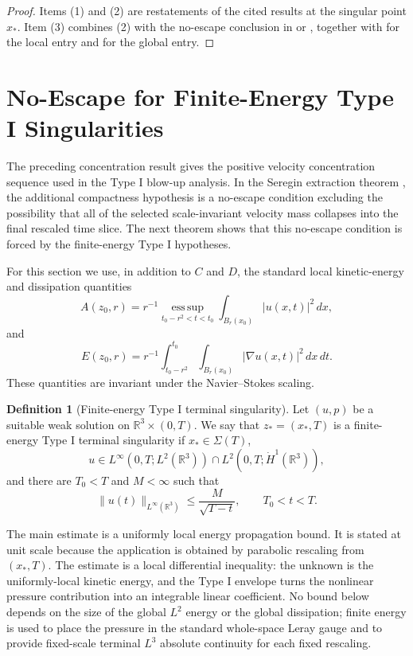 \documentclass[11pt]{amsart}
\theoremstyle{plain}
\theoremstyle{definition}
\newtheorem{definition}[definition]{Definition}
\theoremstyle{remark}
\numberwithin{equation}{section}
\begin{document}
\begin{proof}
Items (1) and (2) are restatements of the cited results at the singular
point \(x_*\).  Item (3) combines (2) with the no-escape conclusion in
 or
, together with
 for the local entry and
 for the global entry.
\end{proof}

\section{No-Escape for Finite-Energy Type I Singularities}
\label{p0:sec:auto-no-escape}

The preceding concentration result gives the positive velocity concentration
sequence used in the Type I blow-up analysis.  In the Seregin extraction
theorem , the
additional compactness hypothesis is a no-escape condition excluding the possibility
that all of the selected scale-invariant velocity mass collapses into the
final rescaled time slice.  The next theorem shows that this no-escape condition is
forced by the finite-energy Type I hypotheses.

For this section we use, in addition to \(C\) and \(D\), the standard local
kinetic-energy and dissipation quantities
\[
  A(z_0,r)
  =r^{-1}\operatorname*{ess\,sup}_{t_0-r^2<t<t_0}
    \int_{B_r(x_0)} |u(x,t)|^2\,dx,
\]
and
\[
  E(z_0,r)
  =r^{-1}\int_{t_0-r^2}^{t_0}\int_{B_r(x_0)}
    |\nabla u(x,t)|^2\,dx\,dt .
\]
These quantities are invariant under the Navier--Stokes scaling.

\begin{definition}[Finite-energy Type I terminal singularity]
\label{p0:def:finite-energy-typeI-paper0}
Let \((u,p)\) be a suitable weak solution on \(\mathbb R^3\times(0,T)\).
We say that \(z_*=(x_*,T)\) is a finite-energy Type I terminal singularity if
\(x_*\in\Sigma(T)\),
\[
  u\in L^\infty(0,T;L^2(\mathbb R^3))
  \cap L^2(0,T;\dot H^1(\mathbb R^3)),
\]
and there are \(T_0<T\) and \(M<\infty\) such that
\begin{equation}\label{p0:eq:paper0-global-typeI}
  \|u(t)\|_{L^\infty(\mathbb R^3)}
  \le \frac{M}{\sqrt{T-t}},
  \qquad T_0<t<T .
\end{equation}
\end{definition}

The main estimate is a uniformly local energy propagation bound.  It is stated
at unit scale because the application is obtained by parabolic rescaling from
\((x_*,T)\).  The estimate is a local differential inequality: the unknown is the
uniformly-local kinetic energy, and the Type I envelope turns the nonlinear
pressure contribution into an integrable linear coefficient.  No bound below
depends on the size of the global \(L^2\) energy or the global dissipation;
finite energy is used to place the pressure in the standard whole-space
Leray gauge and to provide fixed-scale terminal \(L^3\) absolute continuity
for each fixed rescaling.
\end{document}
